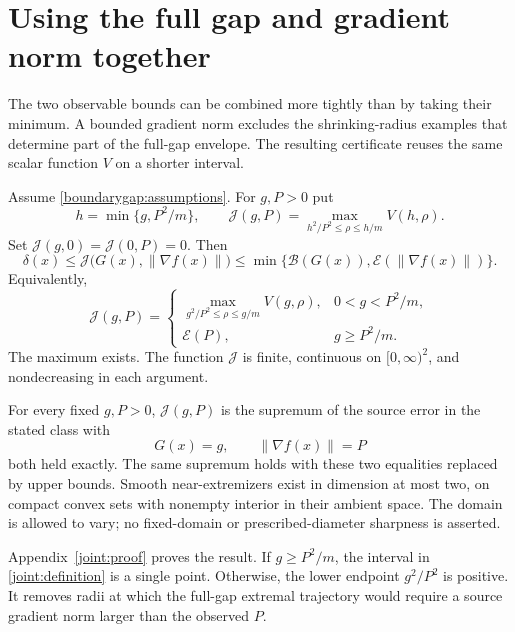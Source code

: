 \section{Using the full gap and gradient norm together}
\label{joint:section}
The two observable bounds can be combined more tightly than by taking
their minimum. A bounded gradient norm excludes the shrinking-radius
examples that determine part of the full-gap envelope. The resulting
certificate reuses the same scalar function $V$ on a shorter interval.

\begin{theorem}
\label{joint:main}
Assume \eqref{boundarygap:assumptions}. For $g,P>0$ put
\begin{equation}\label{joint:definition}
 h=\min\{g,P^2/m\},\qquad
 \mathcal J(g,P)=
 \max_{h^2/P^2\le\rho\le h/m}V(h,\rho).
\end{equation}
Set $\mathcal J(g,0)=\mathcal J(0,P)=0$. Then
\begin{equation}\label{joint:bound}
 \boxed{\delta(x)\le
 \mathcal J\bigl(G(x),\|\nabla f(x)\|\bigr)
 \le\min\{\mathcal B(G(x)),\mathcal E(\|\nabla f(x)\|)\}.}
\end{equation}
Equivalently,
\[
 \mathcal J(g,P)=
 \begin{cases}
 \displaystyle\max_{g^2/P^2\le\rho\le g/m}V(g,\rho),
       &0<g<P^2/m,\\[2mm]
 \mathcal E(P),&g\ge P^2/m.
 \end{cases}
\]
The maximum exists. The function $\mathcal J$ is finite, continuous
on $[0,\infty)^2$, and nondecreasing in each argument.

For every fixed $g,P>0$, $\mathcal J(g,P)$ is the supremum of the
source error in the stated class with
\[
 G(x)=g,\qquad \|\nabla f(x)\|=P
\]
both held exactly. The same supremum holds with these two equalities
replaced by upper bounds. Smooth near-extremizers exist in dimension
at most two, on compact convex sets with nonempty interior in their
ambient space. The domain is allowed to vary; no fixed-domain or
prescribed-diameter sharpness is asserted.
\end{theorem}

Appendix~\ref{joint:proof} proves the result. If $g\ge P^2/m$, the
interval in \eqref{joint:definition} is a single point. Otherwise,
the lower endpoint $g^2/P^2$ is positive. It removes radii at which
the full-gap extremal trajectory would require a source gradient norm
larger than the observed $P$.

